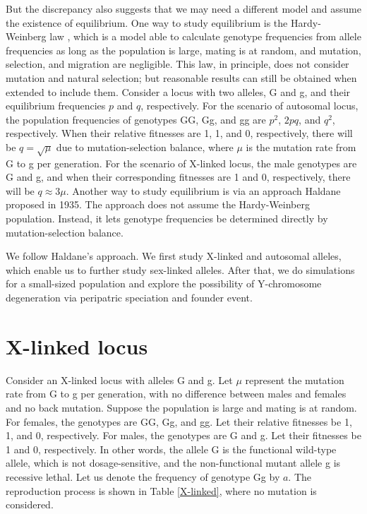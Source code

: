 \documentclass[referee,sn-basic]{sn-jnl}%
\theoremstyle{thmstyleone}%
\theoremstyle{thmstyletwo}%
\theoremstyle{thmstylethree}%
\begin{document}
But the discrepancy also suggests that we may need a different model and assume the existence of equilibrium. One way to study equilibrium is the Hardy-Weinberg law \citep{johnston2019population}, which is a model able to calculate genotype frequencies from allele frequencies as long as the population is large, mating is at random, and mutation, selection, and migration are negligible. This law, in principle, does not consider mutation and natural selection; but reasonable results can still be obtained when extended to include them. Consider a locus with two alleles, G and g, and their equilibrium frequencies $p$ and $q$, respectively. For the scenario of autosomal locus, the population frequencies of genotypes GG, Gg, and gg are $p^2$, $2pq$, and $q^2$, respectively. When their relative fitnesses are 1, 1, and 0, respectively, there will be $q=\sqrt{\mu }$ due to mutation-selection balance, where $\mu$ is the mutation rate from G to g per generation. For the scenario of X-linked locus, the male genotypes are G and g, and when their corresponding fitnesses are 1 and 0, respectively, there will be $q\approx 3\mu$. 
Another way to study equilibrium is via an approach Haldane \citep{Haldane2004a} proposed in 1935. The approach does not assume the Hardy-Weinberg population. Instead, it lets genotype frequencies be determined directly by mutation-selection balance.

We follow Haldane's approach. We first study X-linked and autosomal alleles, which enable us to further study sex-linked alleles. After that, we do simulations for a small-sized population and explore the possibility of Y-chromosome degeneration via peripatric speciation and founder event.

\section{X-linked locus}
Consider an X-linked locus with alleles G and g. Let $\mu$ represent the mutation rate from G to g per generation, with no difference between males and females and no back mutation. Suppose the population is large and mating is at random. 
For females, the genotypes are GG, Gg, and gg. Let their relative fitnesses be 1, 1, and 0, respectively.
For males, the genotypes are G and g. Let their fitnesses be 1 and 0, respectively. In other words, the allele G is the functional wild-type allele, which is not dosage-sensitive, and the non-functional mutant allele g is recessive lethal. Let us denote the frequency of genotype Gg by $a$. The reproduction process is shown in Table \ref{X-linked}, where no mutation is considered.
\end{document}

